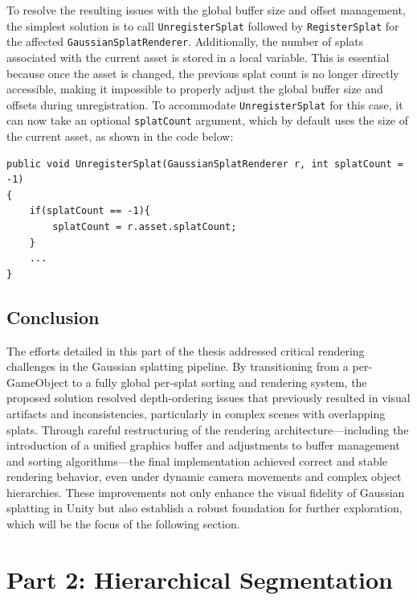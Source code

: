 \documentclass[12pt]{article}
\begin{document}
To resolve the resulting issues with the global buffer size and offset management, the simplest solution is to call \texttt{UnregisterSplat} followed by
\linebreak 
\texttt{RegisterSplat} for the affected \texttt{GaussianSplatRenderer}. Additionally, the number of splats associated with the current asset is stored in a local variable. This is essential because once the asset is changed, the previous splat count is no longer directly accessible, making it impossible to properly adjust the global buffer size and offsets during unregistration. To accommodate \texttt{UnregisterSplat} for this case, it can now take an optional \texttt{splatCount} argument, which by default uses the size of the current asset, as shown in the code below:
\begin{lstlisting}[tabsize=2,caption=A small adjustment to UnregisterSplat, label=code:sort_ratio,breaklines=true,breakatwhitespace=true,basicstyle=\ttfamily\footnotesize]
public void UnregisterSplat(GaussianSplatRenderer r, int splatCount = -1)
{
	if(splatCount == -1){
		splatCount = r.asset.splatCount;
	}	
	...
}
\end{lstlisting}
\subsection{Conclusion}
The efforts detailed in this part of the thesis addressed critical rendering challenges in the Gaussian splatting pipeline. By transitioning from a per-GameObject to a fully global per-splat sorting and rendering system, the proposed solution resolved depth-ordering issues that previously resulted in visual artifacts and inconsistencies, particularly in complex scenes with overlapping splats. Through careful restructuring of the rendering architecture—including the introduction of a unified graphics buffer and adjustments to buffer management and sorting algorithms—the final implementation achieved correct and stable rendering behavior, even under dynamic camera movements and complex object hierarchies. These improvements not only enhance the visual fidelity of Gaussian splatting in Unity but also establish a robust foundation for further exploration, which will be the focus of the following section.
\section{Part 2: Hierarchical Segmentation}  
\end{document}
